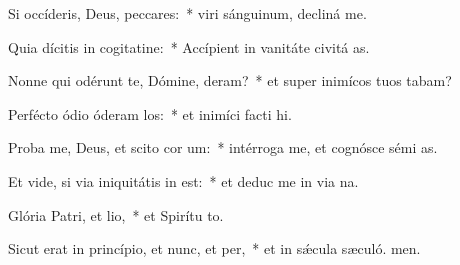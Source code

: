 \item Si occíderis, Deus, peccares:~* viri sánguinum, decliná  me.
\item Quia dícitis in cogitatine:~* Accípient in vanitáte civitá as.
\item Nonne qui odérunt te, Dómine, deram?~* et super inimícos tuos tabam?
\item Perfécto ódio óderam los:~* et inimíci facti  hi.
\item Proba me, Deus, et scito cor um:~* intérroga me, et cognósce sémi as.
\item Et vide, si via iniquitátis in  est:~* et deduc me in via na.
\item Glória Patri, et lio,~* et Spirítu to.
\item Sicut erat in princípio, et nunc, et per,~* et in sǽcula sæculó. men.
